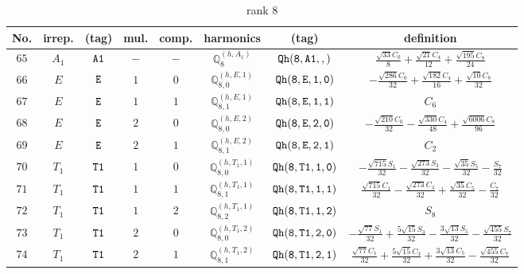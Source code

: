 \documentclass[fleqn,8pt]{jsarticle}
\begin{document}
\begin{table}[ht!]
\begin{center}
\caption{rank 8}
\renewcommand{\arraystretch}{1.3}
\begin{tabular}{cccccccc} \hline \hline
No. & irrep. & (tag) & mul. & comp. & harmonics & (tag) & definition \\ \hline
$ 65 $ & $ A_{1} $ & $ {\tt A1} $ & $ - $ & $ - $ & $ \mathbb{Q}_{8}^{(h,A_{1})} $ & $ {\tt Qh(8,A1,,)} $ & $ \frac{\sqrt{33} C_{0}}{8} + \frac{\sqrt{21} C_{4}}{12} + \frac{\sqrt{195} C_{8}}{24} $ \\
$ 66 $ & $ E $ & $ {\tt E} $ & $ 1 $ & $ 0 $ & $ \mathbb{Q}_{8,0}^{(h,E,1)} $ & $ {\tt Qh(8,E,1,0)} $ & $ - \frac{\sqrt{286} C_{0}}{32} + \frac{\sqrt{182} C_{4}}{16} + \frac{\sqrt{10} C_{8}}{32} $ \\
$ 67 $ & $ E $ & $ {\tt E} $ & $ 1 $ & $ 1 $ & $ \mathbb{Q}_{8,1}^{(h,E,1)} $ & $ {\tt Qh(8,E,1,1)} $ & $ C_{6} $ \\
$ 68 $ & $ E $ & $ {\tt E} $ & $ 2 $ & $ 0 $ & $ \mathbb{Q}_{8,0}^{(h,E,2)} $ & $ {\tt Qh(8,E,2,0)} $ & $ - \frac{\sqrt{210} C_{0}}{32} - \frac{\sqrt{330} C_{4}}{48} + \frac{\sqrt{6006} C_{8}}{96} $ \\
$ 69 $ & $ E $ & $ {\tt E} $ & $ 2 $ & $ 1 $ & $ \mathbb{Q}_{8,1}^{(h,E,2)} $ & $ {\tt Qh(8,E,2,1)} $ & $ C_{2} $ \\
$ 70 $ & $ T_{1} $ & $ {\tt T1} $ & $ 1 $ & $ 0 $ & $ \mathbb{Q}_{8,0}^{(h,T_{1},1)} $ & $ {\tt Qh(8,T1,1,0)} $ & $ - \frac{\sqrt{715} S_{1}}{32} - \frac{\sqrt{273} S_{3}}{32} - \frac{\sqrt{35} S_{5}}{32} - \frac{S_{7}}{32} $ \\
$ 71 $ & $ T_{1} $ & $ {\tt T1} $ & $ 1 $ & $ 1 $ & $ \mathbb{Q}_{8,1}^{(h,T_{1},1)} $ & $ {\tt Qh(8,T1,1,1)} $ & $ \frac{\sqrt{715} C_{1}}{32} - \frac{\sqrt{273} C_{3}}{32} + \frac{\sqrt{35} C_{5}}{32} - \frac{C_{7}}{32} $ \\
$ 72 $ & $ T_{1} $ & $ {\tt T1} $ & $ 1 $ & $ 2 $ & $ \mathbb{Q}_{8,2}^{(h,T_{1},1)} $ & $ {\tt Qh(8,T1,1,2)} $ & $ S_{8} $ \\
$ 73 $ & $ T_{1} $ & $ {\tt T1} $ & $ 2 $ & $ 0 $ & $ \mathbb{Q}_{8,0}^{(h,T_{1},2)} $ & $ {\tt Qh(8,T1,2,0)} $ & $ - \frac{\sqrt{77} S_{1}}{32} + \frac{5 \sqrt{15} S_{3}}{32} - \frac{3 \sqrt{13} S_{5}}{32} - \frac{\sqrt{455} S_{7}}{32} $ \\
$ 74 $ & $ T_{1} $ & $ {\tt T1} $ & $ 2 $ & $ 1 $ & $ \mathbb{Q}_{8,1}^{(h,T_{1},2)} $ & $ {\tt Qh(8,T1,2,1)} $ & $ \frac{\sqrt{77} C_{1}}{32} + \frac{5 \sqrt{15} C_{3}}{32} + \frac{3 \sqrt{13} C_{5}}{32} - \frac{\sqrt{455} C_{7}}{32} $ \\

\end{tabular}
\end{center}
\end{table}
\end{document}
